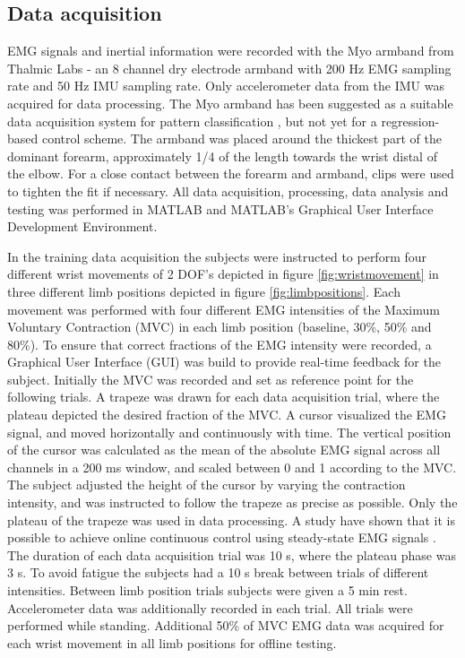 \begin{multicols}{2}
\subsection{Data acquisition}
EMG signals and inertial information were recorded with the Myo armband from Thalmic Labs - an 8 channel dry electrode armband with 200 Hz EMG sampling rate and 50 Hz IMU sampling rate. Only accelerometer data from the IMU was acquired for data processing. The Myo armband has been suggested as a suitable data acquisition system for pattern classification \cite{Mendez2017}, but not yet for a regression-based control scheme. 
The armband was placed around the thickest part of the dominant forearm, approximately 1/4 of the length towards the wrist distal of the elbow. For a close contact between the forearm and armband, clips were used to tighten the fit if necessary. All data acquisition, processing, data analysis and testing was performed in MATLAB and MATLAB's Graphical User Interface Development Environment.

In the training data acquisition the subjects were instructed to perform four different wrist movements of 2 DOF's depicted in figure \ref{fig:wristmovement} in three different limb positions depicted in figure \ref{fig:limbpositions}. Each movement was performed with four different EMG intensities of the Maximum Voluntary Contraction (MVC) in each limb position (baseline, 30\%, 50\% and 80\%). To ensure that correct fractions of the EMG intensity were recorded, a Graphical User Interface (GUI) was build to provide real-time feedback for the subject. Initially the MVC was recorded and set as reference point for the following trials. A trapeze was drawn for each data acquisition trial, where the plateau depicted the desired fraction of the MVC. A cursor visualized the EMG signal, and moved horizontally and continuously with time. The vertical position of the cursor was calculated as the mean of the absolute EMG signal across all channels in a 200 ms window, and scaled between 0 and 1 according to the MVC. The subject adjusted the height of the cursor by varying the contraction intensity, and was instructed to follow the trapeze as precise as possible. Only the plateau of the trapeze was used in data processing. A study have shown that it is possible to achieve online continuous control using steady-state EMG signals \cite{mobarak2014}. The duration of each data acquisition trial was 10 s, where the plateau phase was 3 s. To avoid fatigue the subjects had a 10 s break between trials of different intensities. Between limb position trials subjects were given a 5 min rest. Accelerometer data was additionally recorded in each trial. All trials were performed while standing.
Additional 50\% of MVC EMG data was acquired for each wrist movement in all limb positions for offline testing.


\end{multicols}
